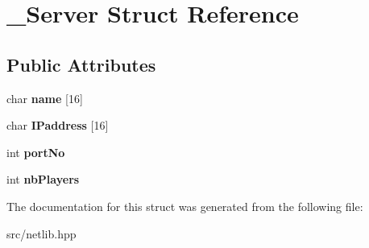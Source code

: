 \hypertarget{struct___server}{}\section{\+\_\+\+Server Struct Reference}
\label{struct___server}
\subsection*{Public Attributes}
\begin{DoxyCompactItemize}
\item 
char {\bfseries name} \mbox{[}16\mbox{]}\hypertarget{struct___server_af7087c1549463291dc55f8d56311694e}{}\label{struct___server_af7087c1549463291dc55f8d56311694e}

\item 
char {\bfseries I\+Paddress} \mbox{[}16\mbox{]}\hypertarget{struct___server_a849e31353405bd7d83ad167451c2f986}{}\label{struct___server_a849e31353405bd7d83ad167451c2f986}

\item 
int {\bfseries port\+No}\hypertarget{struct___server_aa3c9a499c4df79eb3222ee92cc9a1fc3}{}\label{struct___server_aa3c9a499c4df79eb3222ee92cc9a1fc3}

\item 
int {\bfseries nb\+Players}\hypertarget{struct___server_a928a5706037f53ff8e3a2a463b41f697}{}\label{struct___server_a928a5706037f53ff8e3a2a463b41f697}

\end{DoxyCompactItemize}


The documentation for this struct was generated from the following file\+:\begin{DoxyCompactItemize}
\item 
src/netlib.\+hpp\end{DoxyCompactItemize}
